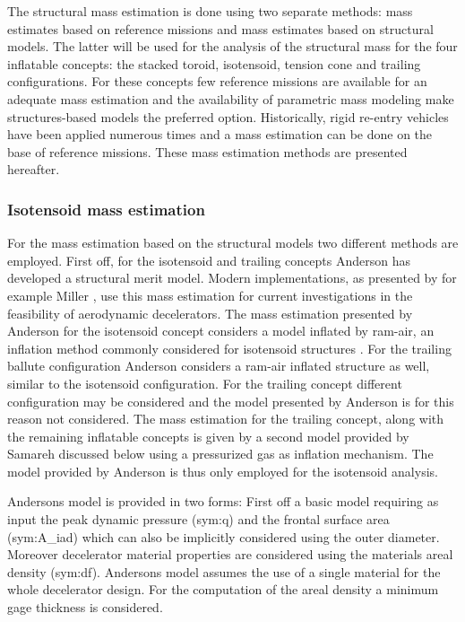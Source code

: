 The structural mass estimation is done using two separate methods: mass estimates based on reference missions and mass estimates based on structural models. The latter will be used for the analysis of the structural mass for the four inflatable concepts: the stacked toroid, isotensoid, tension cone and trailing configurations. For these concepts few reference missions are available for an adequate mass estimation and the availability of parametric mass modeling \cite{Anderson1969, Samareh2011} make structures-based models the preferred option. Historically, rigid re-entry vehicles have been applied numerous times and a mass estimation can be done on the base of reference missions. These mass estimation methods are presented hereafter.

\subsubsection{Isotensoid mass estimation}
For the mass estimation based on the structural models two different methods are employed. First off, for the isotensoid and trailing concepts Anderson \cite{Anderson1969} has developed a structural merit model. Modern implementations, as presented by for example Miller \cite{Miller2014}, use this mass estimation for current investigations in the feasibility of aerodynamic decelerators. The mass estimation presented by Anderson for the isotensoid concept considers a model inflated by ram-air, an inflation method commonly considered for isotensoid structures \cite{Smith2011}. For the trailing ballute configuration Anderson considers a ram-air inflated structure as well, similar to the isotensoid configuration. For the trailing concept different configuration may be considered and the model presented by Anderson is for this reason not considered. The mass estimation for the trailing concept, along with the remaining inflatable concepts is given by a second model provided by Samareh \cite{Samareh2011} discussed below using a pressurized gas as inflation mechanism. The model provided by Anderson is thus only employed for the isotensoid analysis. 

Andersons model is provided in two forms: First off a basic model requiring as input the peak dynamic pressure (\gls{sym:q}) and the frontal surface area (\gls{sym:A_iad}) which can also be implicitly considered using the outer diameter. Moreover decelerator material properties are considered using the materials areal density (\gls{sym:df}). Andersons model assumes the use of a single material for the whole decelerator design. For the computation of the areal density a minimum gage thickness is considered.


